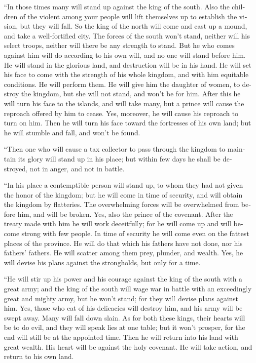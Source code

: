\begin{paracol}{2}
\begin{otherlanguage}{english}
 ``In those times many will stand up against the king of
the south. Also the children of the violent among your people will lift
themselves up to establish the vision, but they will fall.
 So the king of the north will come and cast up a mound,
and take a well-fortified city. The forces of the south won't stand,
neither will his select troops, neither will there be any strength to
stand.  But he who comes against him will do according to
his own will, and no one will stand before him. He will stand in the
glorious land, and destruction will be in his hand.  He
will set his face to come with the strength of his whole kingdom, and
with him equitable conditions. He will perform them. He will give him
the daughter of women, to destroy the kingdom, but she will not stand,
and won't be for him.  After this he will turn his face
to the islands, and will take many, but a prince will cause the reproach
offered by him to cease. Yes, moreover, he will cause his reproach to
turn on him.  Then he will turn his face toward the
fortresses of his own land; but he will stumble and fall, and won't be
found.

 ``Then one who will cause a tax collector to pass
through the kingdom to maintain its glory will stand up in his place;
but within few days he shall be destroyed, not in anger, and not in
battle.

 ``In his place a contemptible person will stand up, to
whom they had not given the honor of the kingdom; but he will come in
time of security, and will obtain the kingdom by flatteries.
 The overwhelming forces will be overwhelmed from before
him, and will be broken. Yes, also the prince of the covenant.
 After the treaty made with him he will work deceitfully;
for he will come up and will become strong with few people.
 In time of security he will come even on the fattest
places of the province. He will do that which his fathers have not done,
nor his fathers' fathers. He will scatter among them prey, plunder, and
wealth. Yes, he will devise his plans against the strongholds, but only
for a time.

 ``He will stir up his power and his courage against the
king of the south with a great army; and the king of the south will wage
war in battle with an exceedingly great and mighty army, but he won't
stand; for they will devise plans against him.  Yes,
those who eat of his delicacies will destroy him, and his army will be
swept away. Many will fall down slain.  As for both these
kings, their hearts will be to do evil, and they will speak lies at one
table; but it won't prosper, for the end will still be at the appointed
time.  Then he will return into his land with great
wealth. His heart will be against the holy covenant. He will take
action, and return to his own land.


\end{otherlanguage}
\end{paracol}
